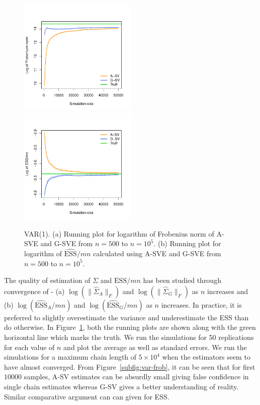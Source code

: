 \documentclass[11pt]{article}
\theoremstyle{remark}
\begin{document}
\begin{figure}[h]
    \centering
      \includegraphics[width = 2.2in]{plots/var-frob.pdf} 
      \includegraphics[width = 2.2in]{plots/var-ess.pdf}         


    \caption{VAR(1). (a) Running plot for logarithm of Frobenius norm of A-SVE and G-SVE from $n = 500$ to $n = 10^5$. (b) Running plot for logarithm of $\widehat{\textrm{ESS}}/mn$ calculated using A-SVE and G-SVE from $n=500$ to $n=10^5$.}
    \label{fig:var-frob_n_ess}
\end{figure}

The quality of estimation of $\Sigma$ and $\text{ESS}/mn$ has been studied through convergence of - (a) $\log(\|\hat{\Sigma}_A\|_F)$ and $\log(\|\hat{\Sigma}_G\|_F)$ as $n$ increases and (b) $\log(\widehat{\textrm{ESS}}_A/mn)$ and $\log(\widehat{\textrm{ESS}}_G/mn)$ as $n$ increases. In practice, it is preferred to slightly overestimate the variance and underestimate the ESS than do otherwise. In Figure~\ref{fig:var-frob_n_ess}, both the running plots are shown along with the green horizontal line which marks the truth. We run the simulations for 50 replications for each value of $n$ and plot the average as well as standard errors. We run the simulations for a maximum chain length of $5 \times 10^4$ when the estimators seem to have almost converged. From Figure~\ref{subfig:var-frob}, it can be seen that for first $10000$ samples, A-SV estimates can be absurdly small giving false confidence in single chain estimates whereas G-SV gives a better understanding of reality. Similar comparative argument can can given for ESS.
\end{document}
